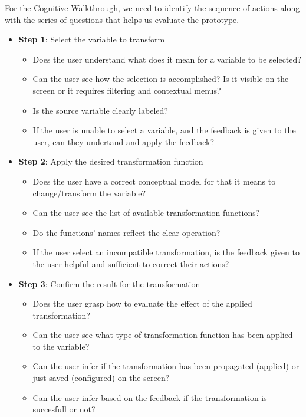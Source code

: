 \documentclass[12pt,letterpaper]{article}
\begin{document}
For the Cognitive Walkthrough, we need to identify the sequence of actions along with the series of questions that helps us evaluate the prototype.

\begin{itemize}
    \item \textbf{Step 1}: Select the variable to transform
    \begin{itemize}
        \item Does the user understand what does it mean for a variable to be selected?
        \item Can the user see how the selection is accomplished? Is it visible on the screen or it requires filtering and contextual menus?
        \item Is the source variable clearly labeled?
        \item If the user is unable to select a variable, and the feedback is given to the user, can they undertand and apply the feedback? 
    \end{itemize}
    \item \textbf{Step 2}: Apply the desired transformation function
    \begin{itemize}
        \item Does the user have a correct conceptual model for that it means to change/transform the variable?
        \item Can the user see the list of available transformation functions?
        \item Do the functions' names reflect the clear operation? 
        \item If the user select an incompatible transformation, is the feedback given to the user helpful and sufficient to correct their actions?
    \end{itemize}
    \item \textbf{Step 3}: Confirm the result for the transformation
    \begin{itemize}
        \item Does the user grasp how to evaluate the effect of the applied transformation?
        \item Can the user see what type of transformation function has been applied to the variable?
        \item Can the user infer if the transformation has been propagated (applied) or just saved (configured) on the screen?
        \item Can the user infer based on the feedback if the transformation is succesfull or not?
    \end{itemize}
\end{itemize}
\end{document}
